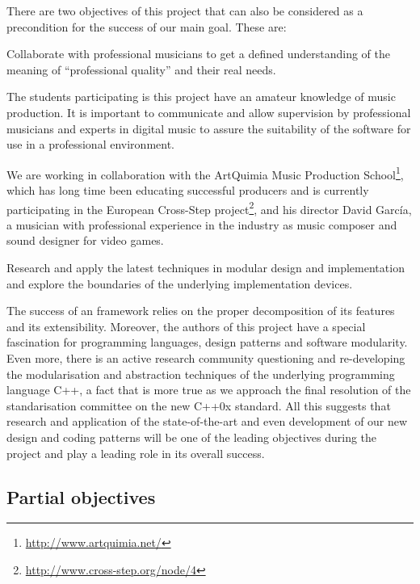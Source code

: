 There are two objectives of this project that can also be considered
as a precondition for the success of our main goal. These are:

\begin{objective} \label{obj:artquimia}
Collaborate with professional musicians to get a
defined understanding of the meaning of ``professional quality'' and
their real needs.
\end{objective}

The students participating is this project have an amateur knowledge of
music production. It is important to communicate and allow supervision
by professional musicians and experts in digital music to assure the
suitability of the software for use in a professional environment.

We are working in collaboration with the ArtQuimia Music Production
School\footnote{\url{http://www.artquimia.net/}}, which has long time
been educating successful producers and is currently participating in
the European Cross-Step
project\footnote{\url{http://www.cross-step.org/node/4}}, and his
director David García, a musician with professional experience in the
industry as music composer and sound designer for video games.

\begin{objective}
  Research and apply the latest techniques in modular design and
  implementation and explore the boundaries of the underlying
  implementation devices.
\end{objective}

The success of an framework relies on the proper decomposition of its
features and its extensibility. Moreover, the authors of this project
have a special fascination for programming languages, design patterns
and software modularity. Even more, there is an active research
community questioning and re-developing the modularisation and
abstraction techniques of the underlying programming language C++,
a fact that is more true as we approach the final resolution of the
standarisation committee on the new C++0x standard. All this suggests
that research and application of the state-of-the-art and even
development of our new design and coding patterns will be one of the
leading objectives during the project and play a leading role in
its overall success.

\subsection{Partial objectives}

